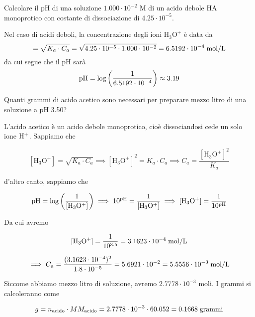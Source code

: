 \newpage

\begin{esercizio}
    Calcolare il pH di una soluzione $1.000 \cdot 10^{-2}$ M di un acido debole HA monoprotico con costante di dissociazione di $4.25 \cdot 10^{-5}$.
\end{esercizio}
\begin{soluzione}
    Nel caso di acidi deboli, la concentrazione degli ioni $\text{H}_3\text{O}^+$ è data da
    \begin{equation*}
        [\text{H}_3\text{O}^+]
        =\sqrt{K_a \cdot C_a}
        =\sqrt{4.25 \cdot 10^{-5} \cdot 1.000 \cdot 10^{-2}}
        =6.5192 \cdot 10^{-4} \; \rm mol/L
    \end{equation*}
    da cui segue che il pH sarà
    \begin{equation*}
        \rm pH=\log{\left(\frac{1}{6.5192 \cdot 10^{-4}}\right)}\approx 3.19
    \end{equation*}
\end{soluzione}

\newpage

\begin{esercizio}
    Quanti grammi di acido acetico sono necessari per preparare mezzo litro di una soluzione a pH 3.50?
\end{esercizio}
\begin{soluzione}
    L'acido acetico è un acido debole monoprotico, cioè dissociandosi cede un solo ione $\rm H^+$. Sappiamo che

$$[\text{H}_3\text{O}^+] = \sqrt{K_a \cdot C_a}
\implies
[\text{H}_3\text{O}^+]^2 = K_a \cdot C_a
\implies
C_a=\frac{[\text{H}_3\text{O}^+]^2}{K_a}$$

d'altro canto, sappiamo che

$$\rm pH=\log{\left(\frac{1}{[H_3O^+]}\right)}
\implies
10^{pH}=\frac{1}{[H_3O^+]}
\implies
[H_3O^+]=\frac{1}{10^{pH}}$$

Da cui avremo

$$\rm [H_3O^+]=\frac{1}{10^{3.5}}=3.1623 \cdot 10^{-4} \; \rm mol/L$$

$$\implies
C_a=\frac{(3.1623 \cdot 10^{-4})^2}{1.8 \cdot 10^{-5}}=5.6921 \cdot 10^{-2}
=5.5556 \cdot 10^{-3} \; \rm mol/L$$

Siccome abbiamo mezzo litro di soluzione, avremo $2.7778 \cdot 10^{-3}$ moli. I grammi si calcoleranno come

$$g=n_{\text{acido}} \cdot MM_{\text{acido}}
=2.7778 \cdot 10^{-3} \cdot 60.052=0.1668 \; \rm grammi$$
\end{soluzione}

